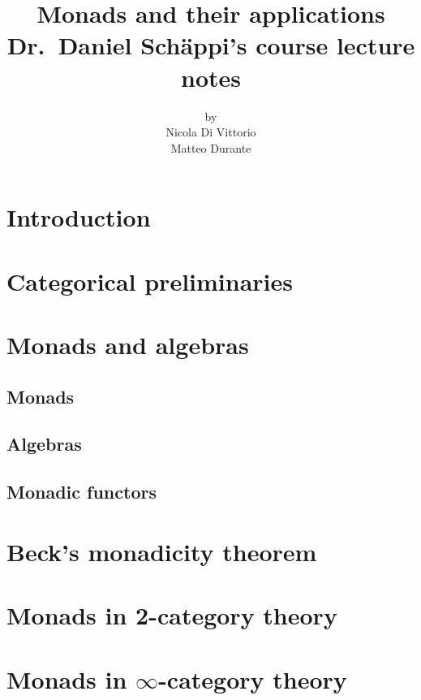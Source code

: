 \documentclass[a4paper,11pt,twoside, openany]{book}
\theoremstyle{definition}
\theoremstyle{definition}
\theoremstyle{remark}
\begin{document}
\author{by \\
	Nicola Di Vittorio \\ Matteo Durante}
\title{\huge Monads and their applications \\
	\vspace*{5mm}
\large Dr.\ Daniel Schäppi's course lecture notes} 
\date{}

\frontmatter
\maketitle
\tableofcontents

\chapter{Introduction}

\mainmatter

\chapter{Categorical preliminaries}
\chapter{Monads and algebras}
\section{Monads}
\section{Algebras}
\section{Monadic functors}
\chapter{Beck’s monadicity theorem}
\chapter{Monads in 2-category theory}
\chapter{Monads in $\infty$-category theory}




\backmatter
\end{document}
